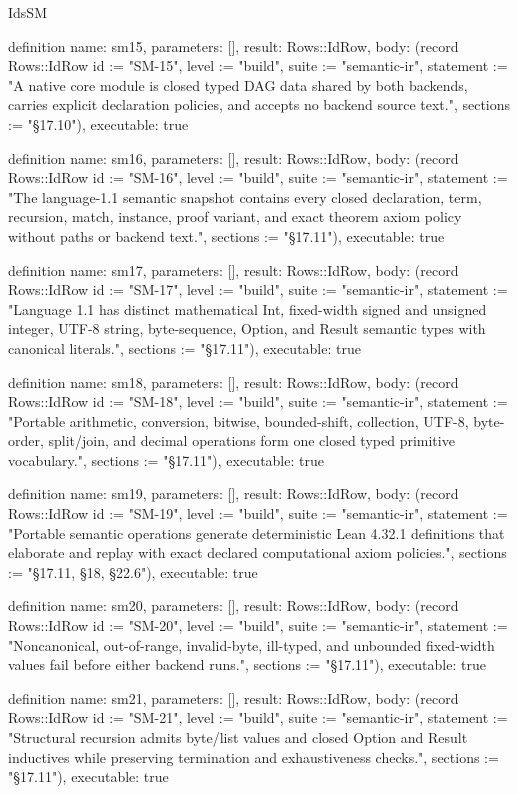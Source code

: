 \begin{lexlean}{IdsSM}
\begin{semanticmodule}
definition{
  name: sm15,
  parameters: [],
  result: Rows::IdRow,
  body: (record Rows::IdRow {id := "SM-15", level := "build", suite := "semantic-ir", statement := "A native core module is closed typed DAG data shared by both backends, carries explicit declaration policies, and accepts no backend source text.", sections := "§17.10"}),
  executable: true
}

definition{
  name: sm16,
  parameters: [],
  result: Rows::IdRow,
  body: (record Rows::IdRow {id := "SM-16", level := "build", suite := "semantic-ir", statement := "The language-1.1 semantic snapshot contains every closed declaration, term, recursion, match, instance, proof variant, and exact theorem axiom policy without paths or backend text.", sections := "§17.11"}),
  executable: true
}

definition{
  name: sm17,
  parameters: [],
  result: Rows::IdRow,
  body: (record Rows::IdRow {id := "SM-17", level := "build", suite := "semantic-ir", statement := "Language 1.1 has distinct mathematical Int, fixed-width signed and unsigned integer, UTF-8 string, byte-sequence, Option, and Result semantic types with canonical literals.", sections := "§17.11"}),
  executable: true
}

definition{
  name: sm18,
  parameters: [],
  result: Rows::IdRow,
  body: (record Rows::IdRow {id := "SM-18", level := "build", suite := "semantic-ir", statement := "Portable arithmetic, conversion, bitwise, bounded-shift, collection, UTF-8, byte-order, split/join, and decimal operations form one closed typed primitive vocabulary.", sections := "§17.11"}),
  executable: true
}

definition{
  name: sm19,
  parameters: [],
  result: Rows::IdRow,
  body: (record Rows::IdRow {id := "SM-19", level := "build", suite := "semantic-ir", statement := "Portable semantic operations generate deterministic Lean 4.32.1 definitions that elaborate and replay with exact declared computational axiom policies.", sections := "§17.11, §18, §22.6"}),
  executable: true
}

definition{
  name: sm20,
  parameters: [],
  result: Rows::IdRow,
  body: (record Rows::IdRow {id := "SM-20", level := "build", suite := "semantic-ir", statement := "Noncanonical, out-of-range, invalid-byte, ill-typed, and unbounded fixed-width values fail before either backend runs.", sections := "§17.11"}),
  executable: true
}

definition{
  name: sm21,
  parameters: [],
  result: Rows::IdRow,
  body: (record Rows::IdRow {id := "SM-21", level := "build", suite := "semantic-ir", statement := "Structural recursion admits byte/list values and closed Option and Result inductives while preserving termination and exhaustiveness checks.", sections := "§17.11"}),
  executable: true
}


\end{semanticmodule}
\end{lexlean}
